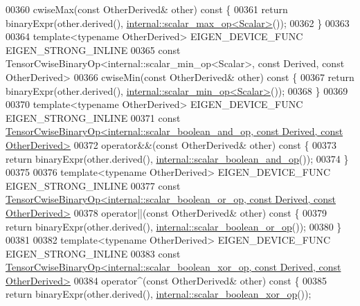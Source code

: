 \begin{DoxyCode}
00360     cwiseMax(\textcolor{keyword}{const} OtherDerived& other)\textcolor{keyword}{ const }\{
00361       \textcolor{keywordflow}{return} binaryExpr(other.derived(), \hyperlink{struct_eigen_1_1internal_1_1scalar__max__op}{internal::scalar\_max\_op<Scalar>}());
00362     \}
00363 
00364     \textcolor{keyword}{template}<\textcolor{keyword}{typename} OtherDerived> EIGEN\_DEVICE\_FUNC EIGEN\_STRONG\_INLINE
00365     \textcolor{keyword}{const} TensorCwiseBinaryOp<internal::scalar\_min\_op<Scalar>, \textcolor{keyword}{const} Derived, \textcolor{keyword}{const} OtherDerived>
00366     cwiseMin(\textcolor{keyword}{const} OtherDerived& other)\textcolor{keyword}{ const }\{
00367       \textcolor{keywordflow}{return} binaryExpr(other.derived(), \hyperlink{struct_eigen_1_1internal_1_1scalar__min__op}{internal::scalar\_min\_op<Scalar>}());
00368     \}
00369 
00370     \textcolor{keyword}{template}<\textcolor{keyword}{typename} OtherDerived> EIGEN\_DEVICE\_FUNC EIGEN\_STRONG\_INLINE
00371     \textcolor{keyword}{const} 
      \hyperlink{class_eigen_1_1_tensor_cwise_binary_op}{TensorCwiseBinaryOp<internal::scalar\_boolean\_and\_op, const Derived, const OtherDerived>}
00372     operator&&(\textcolor{keyword}{const} OtherDerived& other)\textcolor{keyword}{ const }\{
00373       \textcolor{keywordflow}{return} binaryExpr(other.derived(), \hyperlink{struct_eigen_1_1internal_1_1scalar__boolean__and__op}{internal::scalar\_boolean\_and\_op}());
00374     \}
00375 
00376     \textcolor{keyword}{template}<\textcolor{keyword}{typename} OtherDerived> EIGEN\_DEVICE\_FUNC EIGEN\_STRONG\_INLINE
00377     \textcolor{keyword}{const} 
      \hyperlink{class_eigen_1_1_tensor_cwise_binary_op}{TensorCwiseBinaryOp<internal::scalar\_boolean\_or\_op, const Derived, const OtherDerived>}
00378     operator||(\textcolor{keyword}{const} OtherDerived& other)\textcolor{keyword}{ const }\{
00379       \textcolor{keywordflow}{return} binaryExpr(other.derived(), \hyperlink{struct_eigen_1_1internal_1_1scalar__boolean__or__op}{internal::scalar\_boolean\_or\_op}());
00380     \}
00381 
00382     \textcolor{keyword}{template}<\textcolor{keyword}{typename} OtherDerived> EIGEN\_DEVICE\_FUNC EIGEN\_STRONG\_INLINE
00383     \textcolor{keyword}{const} 
      \hyperlink{class_eigen_1_1_tensor_cwise_binary_op}{TensorCwiseBinaryOp<internal::scalar\_boolean\_xor\_op, const Derived, const OtherDerived>}
00384     operator^(\textcolor{keyword}{const} OtherDerived& other)\textcolor{keyword}{ const }\{
00385       \textcolor{keywordflow}{return} binaryExpr(other.derived(), \hyperlink{struct_eigen_1_1internal_1_1scalar__boolean__xor__op}{internal::scalar\_boolean\_xor\_op}());

\end{DoxyCode}
